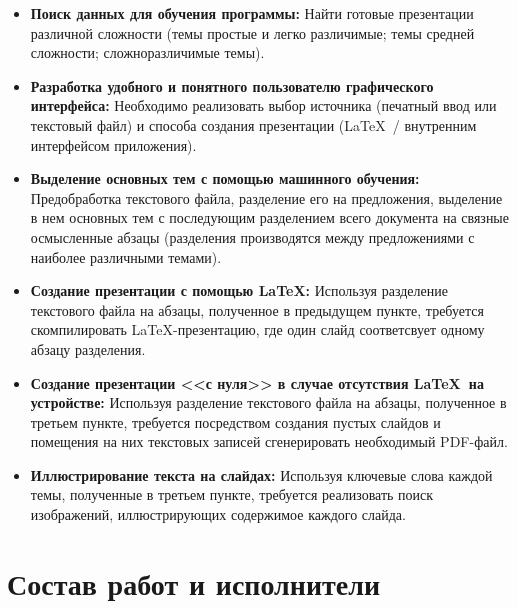   \begin{itemize}
    \item \textbf{Поиск данных для обучения программы:}
    Найти готовые презентации различной сложности (темы простые и легко различимые;
    темы средней сложности; сложноразличимые темы).
    \item \textbf{Разработка удобного и понятного пользователю графического интерфейса:}
    Необходимо реализовать выбор источника (печатный ввод или текстовый файл) и
    способа создания презентации (\LaTeX~/ внутренним интерфейсом приложения).
    \item \textbf{Выделение основных тем с помощью машинного обучения:}
    Предобработка текстового файла, разделение его на предложения, выделение в нем основных тем
    с последующим разделением всего документа на связные осмысленные абзацы (разделения производятся
    между предложениями с наиболее различными темами).
    \item \textbf{Создание презентации с помощью \LaTeX:}
    Используя разделение текстового файла на абзацы, полученное в предыдущем пункте,
    требуется скомпилировать \LaTeX-презентацию, где один слайд соответсвует одному абзацу разделения.
    \item \textbf{Создание презентации <<с нуля>> в случае отсутствия \LaTeX~на устройстве:}
    Используя разделение текстового файла на абзацы, полученное в третьем пункте,
    требуется посредством создания пустых слайдов и помещения на них текстовых записей
    сгенерировать необходимый PDF-файл. 
    \item \textbf{Иллюстрирование текста на слайдах:}
    Используя ключевые слова каждой темы, полученные в третьем пункте, требуется реализовать
    поиск изображений, иллюстрирующих содержимое каждого слайда.
  \end{itemize}

  \newpage
  \section{Состав работ и исполнители}

